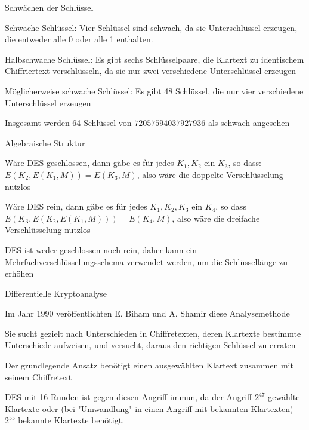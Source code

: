 \documentclass[a4paper]{article}
\begin{document}
\begin{multicols}{3}
      \begin{itemize*}
            \item Schwächen der Schlüssel
            \begin{itemize*}
                  \item Schwache Schlüssel: Vier Schlüssel sind schwach, da sie Unterschlüssel erzeugen, die entweder alle 0 oder alle 1 enthalten.
                  \item Halbschwache Schlüssel: Es gibt sechs Schlüsselpaare, die Klartext zu identischem Chiffriertext verschlüsseln, da sie nur zwei verschiedene Unterschlüssel erzeugen
                  \item Möglicherweise schwache Schlüssel: Es gibt 48 Schlüssel, die nur vier verschiedene Unterschlüssel erzeugen
                  \item Insgesamt werden 64 Schlüssel von $72057594037927936$ als schwach angesehen
            \end{itemize*}
            \item Algebraische Struktur
            \begin{itemize*}
                  \item Wäre DES geschlossen, dann gäbe es für jedes $K_1,K_2$ ein $K_3$, so dass: $E(K_2,E(K_1,M))=E(K_3,M)$, also wäre die doppelte Verschlüsselung nutzlos
                  \item Wäre DES rein, dann gäbe es für jedes $K_1,K_2,K_3$ ein $K_4$, so dass $E(K_3,E(K_2,E(K_1,M)))=E(K_4,M)$, also wäre die dreifache Verschlüsselung nutzlos
                  \item DES ist weder geschlossen noch rein, daher kann ein Mehrfachverschlüsselungsschema verwendet werden, um die Schlüssellänge zu erhöhen
            \end{itemize*}
            \item Differentielle Kryptoanalyse
            \begin{itemize*}
                  \item Im Jahr 1990 veröffentlichten E. Biham und A. Shamir diese Analysemethode
                  \item Sie sucht gezielt nach Unterschieden in Chiffretexten, deren Klartexte bestimmte Unterschiede aufweisen, und versucht, daraus den richtigen Schlüssel zu erraten
                  \item Der grundlegende Ansatz benötigt einen ausgewählten Klartext zusammen mit seinem Chiffretext
                  \item DES mit 16 Runden ist gegen diesen Angriff immun, da der Angriff $2^{47}$ gewählte Klartexte oder (bei "Umwandlung" in einen Angriff mit bekannten Klartexten) $2^55$ bekannte Klartexte benötigt.

\end{itemize*}
\end{itemize*}
\end{multicols}
\end{document}
